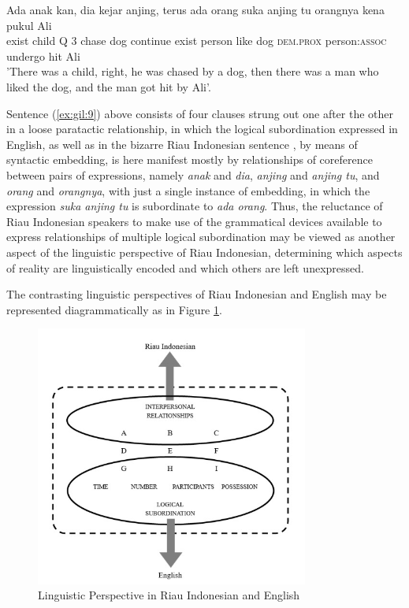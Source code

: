 \documentclass[output=paper,colorlinks,citecolor=brown
]{langscibook}
\begin{document}
\ea \label{ex:gil:9}
\gll Ada	anak	kan,	dia	kejar	anjing,	terus	ada	orang	suka	anjing	tu orangnya	kena	pukul	Ali \\
    exist	child	Q	3	chase	dog	continue	exist	person	like	dog \textsc{dem.prox} person:\textsc{assoc}	undergo	hit	Ali\\
\glt 		'There was a child, right, he was chased by a dog, then there was a man who liked the dog, and the man got hit by Ali'.
\z

Sentence (\ref{ex:gil:9}) above consists of four clauses strung out one after the other in a loose paratactic relationship, in which the logical subordination expressed in English, as well as in the bizarre Riau Indonesian sentence , by means of syntactic embedding, is here manifest mostly by relationships of coreference between pairs of expressions, namely \emph{anak} and \emph{dia}, \emph{anjing} and \emph{anjing tu}, and \emph{orang} and \emph{orangnya}, with just a single instance of embedding, in which the expression \emph{suka anjing tu} is subordinate to \emph{ada orang}.  Thus, the reluctance of Riau Indonesian speakers to make use of the grammatical devices available to express relationships of multiple logical subordination may be viewed as another aspect of the linguistic perspective of Riau Indonesian, determining which aspects of reality are linguistically encoded and which others are left unexpressed.

The contrasting linguistic perspectives of Riau Indonesian and English may be represented diagrammatically as in Figure \ref{fig:gil:fig4}.

\begin{figure}
\centering
\includegraphics[width=0.8\textwidth]{gil_figure4.png}
\caption{\label{fig:gil:fig4}Linguistic Perspective in Riau Indonesian and English}
\end{figure}
\end{document}
